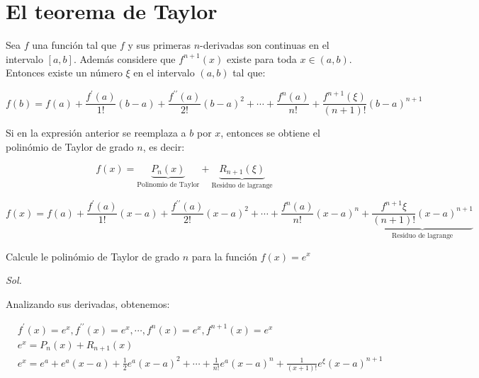 \section{El teorema de Taylor}

\begin{theorem}
	Sea $f$ una función tal que $f$ y sus primeras $n$-derivadas son continuas en el intervalo $[a,b]$.
	Además considere que $f^{n+1}(x)$ existe para toda $x\in (a,b)$. Entonces
	existe un número $\xi$ en el intervalo $(a,b)$ tal que:

	\begin{equation}
		f(b)=f(a)+\frac{f^{\prime}(a)}{1!}\left(b-a\right)+\frac{f^{\prime\prime}(a)}{2!}\left(b-a\right)^2+\cdots+\frac{f^{n}(a)}{n!}+\frac{f^{n+1}(\xi)}{\left(n+1\right)!}\left(b-a\right)^{n+1}
	\end{equation}

	Si en la expresión anterior se reemplaza a $b$ por $x$, entonces se obtiene el polinómio de Taylor de grado $n$, es decir:

	\begin{equation}
		f(x)=\underbrace{P_n(x)}_{\text{Polinomio de Taylor}}+\underbrace{R_{n+1}(\xi)}_{\text{Residuo de lagrange}}
	\end{equation}

	\begin{equation}
		f(x)=f(a)+\frac{f^{\prime}(a)}{1!}\left(x-a\right)+\frac{f^{\prime\prime}(a)}{2!}\left(x-a\right)^2+\cdots+\frac{f^n(a)}{n!}\left(x-a\right)^n+\underbrace{\frac{f^{n+1}\xi}{\left(n+1\right)!}\left(x-a\right)^{n+1}}_{\text{Residuo de lagrange}}
	\end{equation}
\end{theorem}

\begin{example}
	Calcule le polinómio de Taylor de grado $n$ para la función $f(x)=e^x$
\end{example}

\textit{ Sol. }

Analizando sus derivadas, obtenemos:

\begin{align*}
	 & f^{\prime}(x)=e^x,f^{\prime\prime}(x)=e^x,\cdots,f^n(x)=e^x, f^{n+1}(x)=e^x                                                                                     \\
	 & e^x=P_n(x)+R_{n+1}(x)                                                                                                                                           \\
	 & e^x=e^a+e^a\left(x-a\right)+\frac{1}{2}e^a\left(x-a\right)^2+\cdots+\frac{1}{n!}e^a\left(x-a\right)^n+\frac{1}{\left(x+1\right)!}e^{\xi} \left(x-a\right)^{n+1}
\end{align*}

